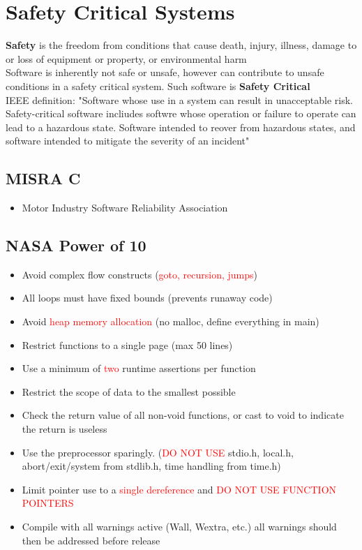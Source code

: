\documentclass{book/custombook}
\begin{document}
    \chapter{Safety Critical Systems}
        \textbf{Safety} is the freedom from conditions that cause death, injury, illness, damage
        to or loss of equipment or property, or environmental harm\\
        Software is inherently not safe or unsafe, however can contribute to unsafe conditions in a
        safety critical system. Such software is \textbf{Safety Critical}\\
        IEEE definition: "Software whose use in a system can result in unacceptable risk. Safety-critical
        software incliudes softwre whose operation or failure to operate can lead to a hazardous state.
        Software intended to reover from hazardous states, and software intended to mitigate the severity
        of an incident"
        \section{MISRA C}
            \begin{itemize}
                \item Motor Industry Software Reliability Association
            \end{itemize}
        \section{NASA Power of 10}
            \begin{itemize}
                \item Avoid complex flow constructs (\textcolor{red}{goto, recursion, jumps})
                \item All loops must have fixed bounds (prevents runaway code)
                \item Avoid \textcolor{red}{heap memory allocation} (no malloc, define everything in main)
                \item Restrict functions to a single page (max 50 lines)
                \item Use a minimum of \textcolor{red}{two} runtime assertions per function
                \item Restrict the scope of data to the smallest possible
                \item Check the return value of all non-void functions, or cast to void to indicate the return is useless
                \item Use the preprocessor sparingly. (\textcolor{red}{DO NOT USE} stdio.h, local.h, abort/exit/system from stdlib.h, time handling from time.h)
                \item Limit pointer use to a \textcolor{red}{single dereference} and \textcolor{red}{DO NOT USE FUNCTION POINTERS}
                \item Compile with all warnings active (Wall, Wextra, etc.) all warnings should then be addressed before release
            \end{itemize}
\end{document}
